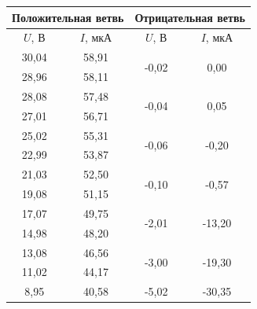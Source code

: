 \documentclass[a4paper,12pt]{article} %
\begin{document}
\begin{table}[h!]
	\centering
	\begin{tabular}{|cc|cc|}
		\hline
		\multicolumn{2}{|c|}{Положительная ветвь} & \multicolumn{2}{c|}{Отрицательная ветвь}                               \\ \hline
		\multicolumn{1}{|c|}{$U$, В}  & $I$, мкА  & \multicolumn{1}{c|}{$U$, В}                  & $I$, мкА                \\ \hline
		\multicolumn{1}{|c|}{30,04}   & 58,91     & \multicolumn{1}{c|}{\multirow{2}{*}{-0,02}}  & \multirow{2}{*}{0,00}   \\ \cline{1-2}
		\multicolumn{1}{|c|}{28,96}   & 58,11     & \multicolumn{1}{c|}{}                        &                         \\ \hline
		\multicolumn{1}{|c|}{28,08}   & 57,48     & \multicolumn{1}{c|}{\multirow{2}{*}{-0,04}}  & \multirow{2}{*}{0,05}   \\ \cline{1-2}
		\multicolumn{1}{|c|}{27,01}   & 56,71     & \multicolumn{1}{c|}{}                        &                         \\ \hline
		\multicolumn{1}{|c|}{25,02}   & 55,31     & \multicolumn{1}{c|}{\multirow{2}{*}{-0,06}}  & \multirow{2}{*}{-0,20}  \\ \cline{1-2}
		\multicolumn{1}{|c|}{22,99}   & 53,87     & \multicolumn{1}{c|}{}                        &                         \\ \hline
		\multicolumn{1}{|c|}{21,03}   & 52,50     & \multicolumn{1}{c|}{\multirow{2}{*}{-0,10}}  & \multirow{2}{*}{-0,57}  \\ \cline{1-2}
		\multicolumn{1}{|c|}{19,08}   & 51,15     & \multicolumn{1}{c|}{}                        &                         \\ \hline
		\multicolumn{1}{|c|}{17,07}   & 49,75     & \multicolumn{1}{c|}{\multirow{2}{*}{-2,01}}  & \multirow{2}{*}{-13,20} \\ \cline{1-2}
		\multicolumn{1}{|c|}{14,98}   & 48,20     & \multicolumn{1}{c|}{}                        &                         \\ \hline
		\multicolumn{1}{|c|}{13,08}   & 46,56     & \multicolumn{1}{c|}{\multirow{2}{*}{-3,00}}  & \multirow{2}{*}{-19,30} \\ \cline{1-2}
		\multicolumn{1}{|c|}{11,02}   & 44,17     & \multicolumn{1}{c|}{}                        &                         \\ \hline
		\multicolumn{1}{|c|}{8,95}    & 40,58     & \multicolumn{1}{c|}{\multirow{2}{*}{-5,02}}  & \multirow{2}{*}{-30,35} \\ \cline{1-2}

\end{tabular}
\end{table}
\end{document}
